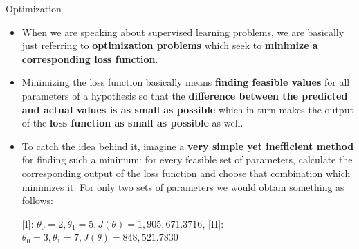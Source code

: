 \documentclass[document.tex]{subfiles}
\begin{document}
	\begin{frame}{Optimization}
		\begin{itemize}
			\item When we are speaking about supervised learning problems, we are basically just referring to \textbf{optimization problems} which seek to \textbf{minimize a corresponding loss function}.
			\item Minimizing the loss function basically means \textbf{finding feasible values} for all parameters of a hypothesis so that the \textbf{difference between the predicted and actual values is as small as possible} which in turn makes the output of the \textbf{loss function as small as possible} as well.
			\item To catch the idea behind it, imagine a \textbf{very simple yet inefficient method} for finding such a minimum: for every feasible set of parameters, calculate the corresponding output of the loss function and choose that combination which minimizes it. For only two sets of parameters we would obtain something as follows:
			\vspace{3mm}
			\begin{table}
				\scalebox{0.8}{}
				\caption*{[I]: $\theta_0 = 2, \theta_1 = 5, J(\theta) = 1{,}905{,}671.3716$, [II]: $\theta_0 = 3, \theta_1 = 7, J(\theta) = 848{,}521.7830$}
			\end{table}
			\vspace{-5mm}
		\end{itemize}
	\end{frame}
\end{document}
